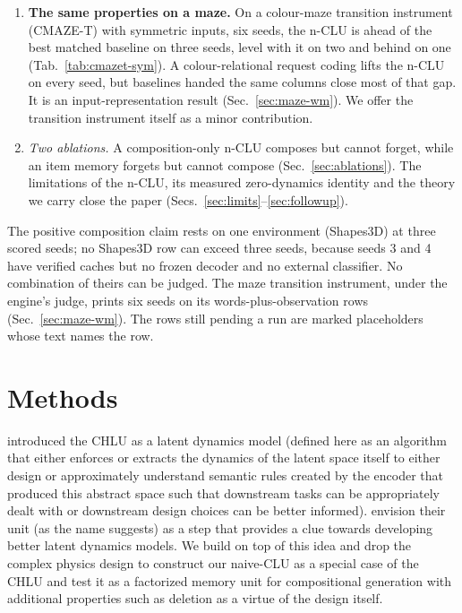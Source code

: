 \documentclass{article} %
\begin{document}
\begin{enumerate}
  separate, structural mechanism, a hole in a coupling table (Sec.~\ref{sec:hole}).
\item \textbf{The same properties on a maze.} On a colour-maze transition instrument (CMAZE-T) with
  symmetric inputs, six seeds, the n-CLU is ahead of
  the best matched baseline on three seeds, level with it on two and behind on one
  (Tab.~\ref{tab:cmazet-sym}). A colour-relational request coding lifts the n-CLU on every seed, but baselines handed the %
  same columns close most of that gap. It is an input-representation result
  (Sec.~\ref{sec:maze-wm}). We offer the transition instrument itself as a minor contribution.
\item \emph{Two ablations.} A composition-only n-CLU composes but cannot
  forget, while an item memory forgets but cannot compose (Sec.~\ref{sec:ablations}). The
  limitations of the n-CLU, its measured zero-dynamics identity and the theory we carry
  close the paper (Secs.~\ref{sec:limits}--\ref{sec:followup}).
\end{enumerate}

\noindent The positive composition claim rests
on one environment (Shapes3D) at three scored seeds; no Shapes3D row can exceed three seeds,
because seeds 3 and 4 have verified caches but no frozen decoder and no external classifier. No
combination of theirs can be judged. %
The maze transition instrument, under the engine's judge, prints six seeds on its words-plus-observation rows
(Sec.~\ref{sec:maze-wm}). The rows still pending a run are marked placeholders whose text names the row.

\section{Methods}
\label{sec:object}

\citet{jawahar2026chlu} introduced the CHLU as a latent dynamics model (defined here as an algorithm
that either enforces or extracts the dynamics of the latent space itself to either design or
approximately understand semantic rules created by the encoder that produced this abstract space
such that downstream tasks can be appropriately dealt with or downstream design choices can be
better informed). \citet{jawahar2026chlu} envision their unit (as the name suggests) as a step that
provides a clue towards developing better latent dynamics models. We build on top of this idea and
drop the complex physics design to construct our naive-CLU as a special case of the CHLU and test it
as a factorized memory unit for compositional generation with additional properties such as deletion
as a virtue of the design itself.
\end{document}
